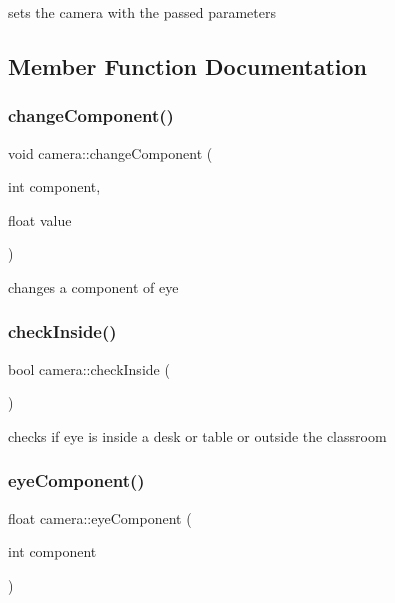 sets the camera with the passed parameters 

\subsection{Member Function Documentation}
\hypertarget{classcamera_a50833d5cf4b6237cfd7a32f8c168ab6b}{}\label{classcamera_a50833d5cf4b6237cfd7a32f8c168ab6b} 
\subsubsection{\texorpdfstring{change\+Component()}{changeComponent()}}
{\footnotesize\ttfamily void camera\+::change\+Component (\begin{DoxyParamCaption}\item[{int}]{component,  }\item[{float}]{value }\end{DoxyParamCaption})}

changes a component of eye \hypertarget{classcamera_ae8d364c57e362bc1141625896c1a88e2}{}\label{classcamera_ae8d364c57e362bc1141625896c1a88e2} 
\subsubsection{\texorpdfstring{check\+Inside()}{checkInside()}}
{\footnotesize\ttfamily bool camera\+::check\+Inside (\begin{DoxyParamCaption}{ }\end{DoxyParamCaption})}

checks if eye is inside a desk or table or outside the classroom \hypertarget{classcamera_a66f5b769bac0e8e0061b9ee218742aa2}{}\label{classcamera_a66f5b769bac0e8e0061b9ee218742aa2} 
\subsubsection{\texorpdfstring{eye\+Component()}{eyeComponent()}}
{\footnotesize\ttfamily float camera\+::eye\+Component (\begin{DoxyParamCaption}\item[{int}]{component }\end{DoxyParamCaption})}

